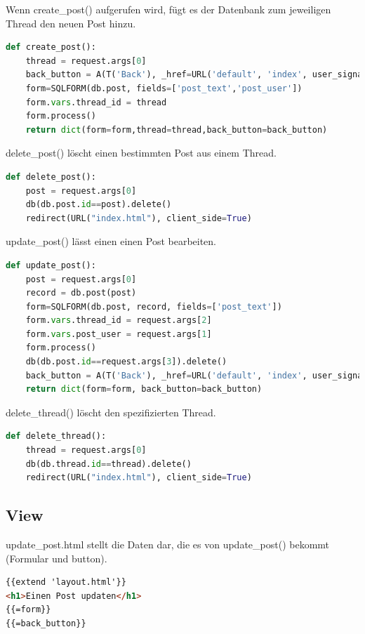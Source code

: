Wenn create\_post() aufgerufen wird, fügt es der Datenbank zum jeweiligen Thread den neuen Post hinzu.
\begin{lstlisting}[language=python]
def create_post():
    thread = request.args[0]
    back_button = A(T('Back'), _href=URL('default', 'index', user_signature=True), _class='btn')
    form=SQLFORM(db.post, fields=['post_text','post_user'])
    form.vars.thread_id = thread
    form.process()
    return dict(form=form,thread=thread,back_button=back_button)
\end{lstlisting}

delete\_post() löscht einen bestimmten Post aus einem Thread.
\begin{lstlisting}[language=python]
def delete_post():
    post = request.args[0]
    db(db.post.id==post).delete()
    redirect(URL("index.html"), client_side=True)
\end{lstlisting}

update\_post() lässt einen einen Post bearbeiten.
\begin{lstlisting}[language=python]
def update_post():
    post = request.args[0]
    record = db.post(post)
    form=SQLFORM(db.post, record, fields=['post_text'])
    form.vars.thread_id = request.args[2]
    form.vars.post_user = request.args[1]
    form.process()
    db(db.post.id==request.args[3]).delete()
    back_button = A(T('Back'), _href=URL('default', 'index', user_signature=True), _class='btn')
    return dict(form=form, back_button=back_button)
\end{lstlisting}

delete\_thread() löscht den spezifizierten Thread.
\begin{lstlisting}[language=python]
def delete_thread():
    thread = request.args[0]
    db(db.thread.id==thread).delete()
    redirect(URL("index.html"), client_side=True)
\end{lstlisting}

\subsection{View}
update\_post.html stellt die Daten dar, die es von update\_post() bekommt (Formular und button).
\begin{lstlisting}[language=html]
{{extend 'layout.html'}}
<h1>Einen Post updaten</h1>
{{=form}}
{{=back_button}}
\end{lstlisting}

